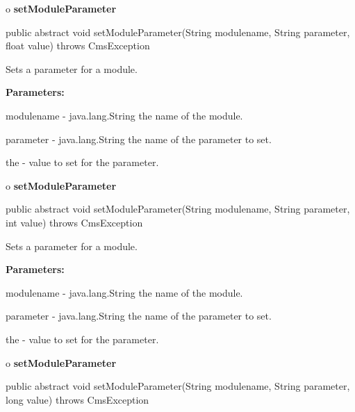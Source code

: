 o {\bf setModuleParameter} 

\begin{PRE}
 public abstract void setModuleParameter(String modulename,
                                         String parameter,
                                         float value) throws CmsException
\end{PRE}

\begin{description}
\htmlDD Sets a parameter for a module. 

\begin{description}
\item {\bf Parameters:}  

modulename - java.lang.String the name of the module.  

parameter - java.lang.String the name of the parameter to set.  

the - value to set for the parameter.  
\end{description}

\end{description}

o {\bf setModuleParameter} 

\begin{PRE}
 public abstract void setModuleParameter(String modulename,
                                         String parameter,
                                         int value) throws CmsException
\end{PRE}

\begin{description}
\htmlDD Sets a parameter for a module. 

\begin{description}
\item {\bf Parameters:}  

modulename - java.lang.String the name of the module.  

parameter - java.lang.String the name of the parameter to set.  

the - value to set for the parameter.  
\end{description}

\end{description}

o {\bf setModuleParameter} 

\begin{PRE}
 public abstract void setModuleParameter(String modulename,
                                         String parameter,
                                         long value) throws CmsException
\end{PRE}

